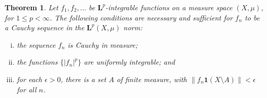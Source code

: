 \documentclass[12pt]{article}
\newtheorem*{thm*}{Theorem}
\newcommand{\abs}[1]{\lvert#1\rvert}
\newcommand{\norm}[1]{\lVert#1\rVert}
\newcommand{\Le}{\mathbf{L}}
\newcommand{\indc}{\mathbf{1}}
\begin{document}


\begin{thm*}
Let $f_1, f_2, \dotsc$ be $\Le^p$-integrable functions on 
a measure space $(X, \mu)$, for $1 \leq p < \infty$.
The following conditions are necessary and sufficient for
$f_n$ to be a Cauchy sequence in the $\Le^p(X,\mu)$ norm:

\begin{enumerate}[(i)]
\item
the sequence $f_n$ is Cauchy in measure;
\item
the functions $\{ \abs{f_n}^p \}$ are uniformly integrable; and
\item
for each $\epsilon > 0$, there is a set $A$
of finite measure, with $\norm{f_n \indc(X \setminus A)} < \epsilon$
for all $n$.
\end{enumerate}
\end{thm*}
\end{document}
